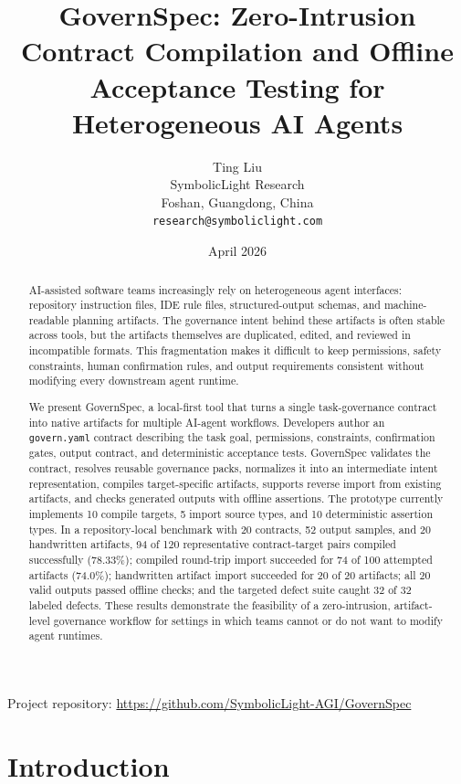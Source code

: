 \documentclass[11pt]{article}
\title{GovernSpec: Zero-Intrusion Contract Compilation and Offline Acceptance Testing for Heterogeneous AI Agents}
\author{Ting Liu\\
SymbolicLight Research\\
Foshan, Guangdong, China\\
\texttt{research@symboliclight.com}}
\date{April 2026}
\begin{document}
\maketitle

\begin{center}
\small Project repository: \url{https://github.com/SymbolicLight-AGI/GovernSpec}
\end{center}

\begin{abstract}
AI-assisted software teams increasingly rely on heterogeneous agent interfaces:
repository instruction files, IDE rule files, structured-output schemas, and
machine-readable planning artifacts. The governance intent behind these artifacts is
often stable across tools, but the artifacts themselves are duplicated, edited, and
reviewed in incompatible formats. This fragmentation makes it difficult to keep
permissions, safety constraints, human confirmation rules, and output requirements
consistent without modifying every downstream agent runtime.

We present GovernSpec, a local-first tool that turns a single task-governance
contract into native artifacts for multiple AI-agent workflows. Developers author an
\texttt{govern.yaml} contract describing the task goal, permissions, constraints,
confirmation gates, output contract, and deterministic acceptance tests. GovernSpec
validates the contract, resolves reusable governance packs, normalizes it into an
intermediate intent representation, compiles target-specific artifacts, supports
reverse import from existing artifacts, and checks generated outputs with offline
assertions. The prototype currently implements 10 compile targets, 5 import source
types, and 10 deterministic assertion types. In a repository-local benchmark with
20 contracts, 52 output samples, and 20 handwritten artifacts, 94 of 120
representative contract-target pairs compiled successfully (78.33\%); compiled
round-trip import succeeded for 74 of 100 attempted artifacts (74.0\%);
handwritten artifact import succeeded for 20 of 20 artifacts; all 20 valid outputs
passed offline checks; and the targeted defect suite caught 32 of 32 labeled
defects. These results demonstrate
the feasibility of a zero-intrusion, artifact-level governance workflow for
settings in which teams cannot or do not want to modify agent runtimes.
\end{abstract}

\section{Introduction}
\end{document}
